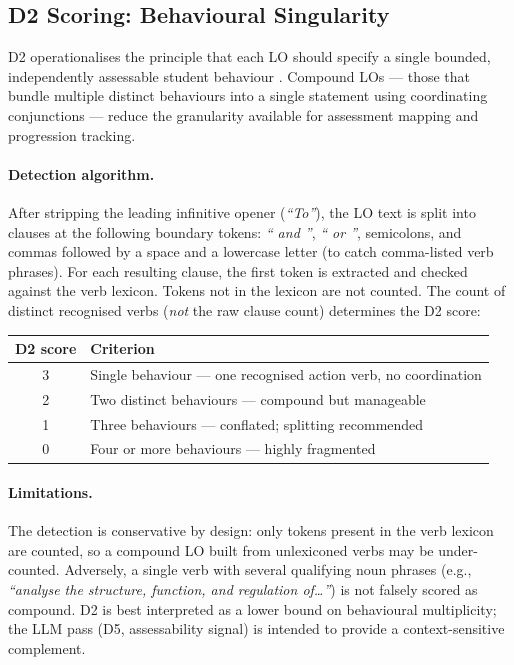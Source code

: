 \documentclass[12pt, a4paper]{article}
\begin{document}
\subsection{D2 Scoring: Behavioural Singularity}
\label{sec:d2}

D2 operationalises the principle that each LO should specify a single bounded,
independently assessable student behaviour \citep{biggs2011teaching, qqi2016core}.
Compound LOs — those that bundle multiple distinct behaviours into a single statement
using coordinating conjunctions — reduce the granularity available for assessment
mapping and progression tracking.

\paragraph{Detection algorithm.}
After stripping the leading infinitive opener (\textit{``To''}), the LO text is
split into clauses at the following boundary tokens: \textit{`` and ''}, \textit{`` or ''},
semicolons, and commas followed by a space and a lowercase letter (to catch comma-listed
verb phrases). For each resulting clause, the first token is extracted and checked
against the verb lexicon. Tokens not in the lexicon are not counted. The count of
distinct recognised verbs (\textit{not} the raw clause count) determines the D2 score:

\begin{center}
\begin{tabular}{cl}
\toprule
\textbf{D2 score} & \textbf{Criterion} \\
\midrule
3 & Single behaviour — one recognised action verb, no coordination \\
2 & Two distinct behaviours — compound but manageable \\
1 & Three behaviours — conflated; splitting recommended \\
0 & Four or more behaviours — highly fragmented \\
\bottomrule
\end{tabular}
\end{center}

\paragraph{Limitations.}
The detection is conservative by design: only tokens present in the verb lexicon are
counted, so a compound LO built from unlexiconed verbs may be under-counted.
Adversely, a single verb with several qualifying noun phrases (e.g., \textit{``analyse
the structure, function, and regulation of\ldots''}) is not falsely scored as compound.
D2 is best interpreted as a lower bound on behavioural multiplicity; the LLM pass
(D5, assessability signal) is intended to provide a context-sensitive complement.
\end{document}

